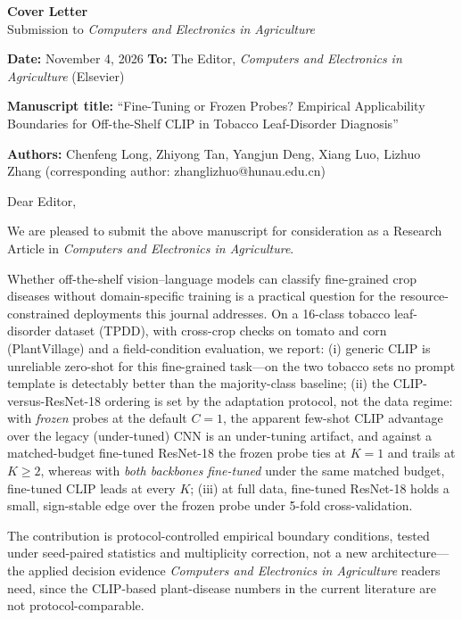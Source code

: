 \documentclass[11pt,a4paper]{article}
\begin{document}
\begin{center}
{\large\bfseries Cover Letter}\\[4pt]
{\normalsize Submission to \emph{Computers and Electronics in Agriculture}}
\end{center}

\vspace{0.8em}

\noindent\textbf{Date:} November 4, 2026\qquad
\textbf{To:} The Editor, \emph{Computers and Electronics in Agriculture} (Elsevier)

\noindent\textbf{Manuscript title:} ``Fine-Tuning or Frozen Probes? Empirical Applicability Boundaries for Off-the-Shelf CLIP in Tobacco Leaf-Disorder Diagnosis''

\noindent\textbf{Authors:} Chenfeng Long, Zhiyong Tan, Yangjun Deng, Xiang Luo, Lizhuo Zhang (corresponding author: zhanglizhuo@hunau.edu.cn)

\vspace{0.8em}

Dear Editor,

We are pleased to submit the above manuscript for consideration as a Research Article in \emph{Computers and Electronics in Agriculture}.

Whether off-the-shelf vision--language models can classify fine-grained crop diseases without domain-specific training is a practical question for the resource-constrained deployments this journal addresses. On a 16-class tobacco leaf-disorder dataset (TPDD), with cross-crop checks on tomato and corn (PlantVillage) and a field-condition evaluation, we report: (i) generic CLIP is unreliable zero-shot for this fine-grained task---on the two tobacco sets no prompt template is detectably better than the majority-class baseline; (ii) the CLIP-versus-ResNet-18 ordering is set by the adaptation protocol, not the data regime: with \emph{frozen} probes at the default $C{=}1$, the apparent few-shot CLIP advantage over the legacy (under-tuned) CNN is an under-tuning artifact, and against a matched-budget fine-tuned ResNet-18 the frozen probe ties at $K{=}1$ and trails at $K{\geq}2$, whereas with \emph{both backbones fine-tuned} under the same matched budget, fine-tuned CLIP leads at every $K$; (iii) at full data, fine-tuned ResNet-18 holds a small, sign-stable edge over the frozen probe under 5-fold cross-validation.

The contribution is protocol-controlled empirical boundary conditions, tested under seed-paired statistics and multiplicity correction, not a new architecture---the applied decision evidence \emph{Computers and Electronics in Agriculture} readers need, since the CLIP-based plant-disease numbers in the current literature are not protocol-comparable.
\end{document}
